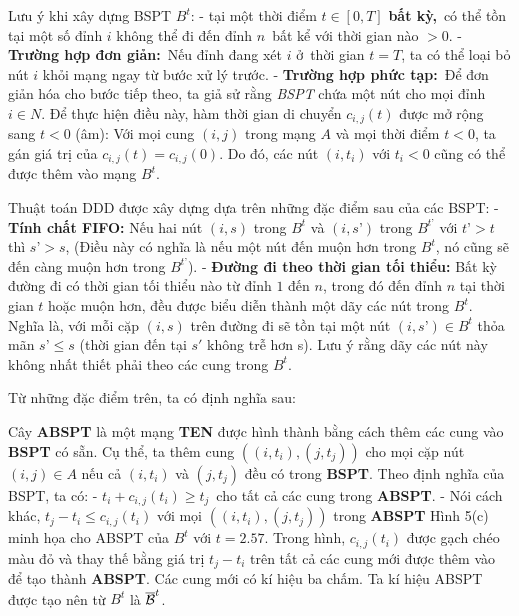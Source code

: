 \documentclass[14pt,oneside]{scrbook}
\begin{document}
Lưu ý khi xây dựng BSPT \(B^t\): - tại một thời điểm \(t \in [0, T]\)
\textbf{bất kỳ,}~có thể tồn tại một số đỉnh \(i\) không thể đi đến đỉnh
\(n\)~bất kể với thời gian nào \(> 0\). - \textbf{Trường hợp đơn
giản:}~Nếu đỉnh đang xét \(i\) ở~thời gian \(t = T\), ta có thể loại bỏ
nút \(i\) khỏi mạng ngay từ bước xử lý trước. - \textbf{Trường hợp phức
tạp:}~Để đơn giản hóa cho bước tiếp theo, ta giả sử rằng \emph{BSPT}
chứa một nút cho mọi đỉnh \(i \in N\). Để thực hiện điều này, hàm thời
gian di chuyển \(c_{i,j}(t)\) được mở rộng sang \(t < 0\) (âm): Với mọi
cung \((i, j)\) trong mạng \(A\) và mọi thời điểm \(t < 0\), ta gán giá
trị của \(c_{i,j}(t) = c_{i,j}(0)\). Do đó, các nút \((i, t_i)\) với
\(t_i<0\) cũng có thể được thêm vào mạng \(B^t\).

Thuật toán DDD được xây dựng dựa trên những đặc điểm sau của các BSPT: -
\textbf{Tính chất FIFO:} Nếu hai nút \((i, s)\) trong \(B^t\) và
\((i, s’)\) trong \(B^{t’}\) với \(t’ > t\) thì \(s’ > s\), (Điều này có
nghĩa là nếu một nút đến muộn hơn trong \(B^t\), nó cũng sẽ đến càng
muộn hơn trong \(B^{t’}\)). - \textbf{Đường đi theo thời gian tối
thiểu:} Bất kỳ đường đi có thời gian tối thiểu nào từ đỉnh \(1\) đến
\(n\), trong đó đến đỉnh \(n\) tại thời gian \(t\) hoặc muộn hơn, đều
được biểu diễn thành một dãy các nút trong \(B^t\). Nghĩa là, với mỗi
cặp \((i, s)\) trên đường đi sẽ tồn tại một nút \((i, s’) \in B^t\) thỏa
mãn \(s’ \le s\) (thời gian đến tại \(s'\) không trễ hơn s). Lưu ý rằng
dãy các nút này không nhất thiết phải theo các cung trong \(B^t\).

Từ những đặc điểm trên, ta có định nghĩa sau:

Cây \textbf{ABSPT} là một mạng \textbf{TEN} được hình thành bằng cách
thêm các cung vào \textbf{BSPT} có sẵn. Cụ thể, ta thêm cung
\(((i, t_i), (j, t_j))\) cho mọi cặp nút \((i, j) \in A\) nếu cả
\((i, t_i)\) và \((j, t_j)\) đều có trong \textbf{BSPT}. Theo định nghĩa
của BSPT, ta có: - \(t_i + c_{i,j}(t_i) \ge t_j\)~cho tất cả các cung
trong \textbf{ABSPT}. - Nói cách khác, \(t_j - t_i \le c_{i,j}(t_i)\)
với mọi \(((i, t_i), (j, t_j))\) trong \textbf{ABSPT} Hình 5(c) minh họa
cho ABSPT của \(B^t\) với \(t = 2.57\). Trong hình, \(c_{i,j}(t_i)\)
được gạch chéo màu đỏ và thay thế bằng giá trị \(t_j - t_i\) trên tất cả
các cung mới được thêm vào để tạo thành \textbf{ABSPT}. Các cung mới có
kí hiệu ba chấm. Ta kí hiệu ABSPT được tạo nên từ \(B^t\) là
\(\overline{\cal B}^t\).
\end{document}
